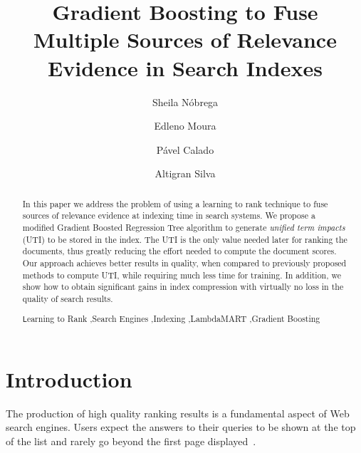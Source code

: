 \documentclass[preprint,review,10pt,3p]{elsarticle}
\begin{document}
\begin{frontmatter}



\title{Gradient Boosting to Fuse Multiple Sources of Relevance Evidence in Search Indexes}

\author[mymainaddress]{Sheila N{\'obrega}}
\author[mymainaddress]{Edleno Moura}
\author[mysecondaryaddress]{P{\'a}vel Calado}
\author[mymainaddress]{Altigran Silva}

\address[mymainaddress]{Universidade Federal do Amazonas, Brasil}
\address[mysecondaryaddress]{INESC-ID, Instituto Superior T{\'e}cnico, Universidade de Lisboa}

\begin{abstract}

In this paper we address the problem of using a learning to rank technique to fuse sources of relevance evidence at indexing time in search systems. We propose a modified Gradient Boosted Regression Tree algorithm to generate \textit{unified term impacts} (UTI) to be stored in the index.
The UTI is the only value needed later for ranking the documents, thus greatly reducing the effort needed to compute the document scores. 
Our approach achieves better results in quality, when compared to previously proposed methods to compute UTI, while requiring much less time for training. In addition, we show how to obtain significant gains in index compression with virtually no loss in the quality of search results.

\begin{keyword}
\texttt Learning to Rank \sep Search Engines \sep Indexing \sep LambdaMART \sep Gradient Boosting
\end{keyword}

\end{abstract}
\end{frontmatter}




\section{Introduction}
\label{intro}

The production of high quality ranking results is a fundamental aspect of Web search engines. Users expect the answers to their queries to be shown at the top of the list and rarely go beyond the first page displayed~\cite{saraiva2001rank}. 
\end{document}
